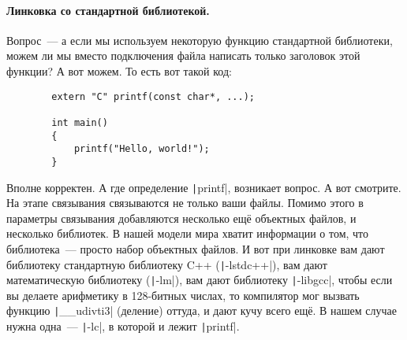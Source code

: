 \documentclass{article}
\begin{document}
    \paragraph{Линковка со стандартной библиотекой.}
    Вопрос~--- а если мы используем некоторую функцию стандартной библиотеки, можем ли мы вместо подключения файла написать только заголовок этой функции? А вот можем. То есть вот такой код:
    \begin{verbatim}
        extern "C" printf(const char*, ...);
        
        int main()
        {
            printf("Hello, world!");
        }
    \end{verbatim}
    Вполне корректен. А где определение \texttt|printf|, возникает вопрос. А вот смотрите. На этапе связывания связываются не только ваши файлы. Помимо этого в параметры связывания добавляются несколько ещё объектных файлов, и несколько библиотек. В нашей модели мира хватит информации о том, что библиотека~--- просто набор объектных файлов. И вот при линковке вам дают библиотеку стандартную библиотеку C++ (\texttt|-lstdc++|), вам дают математическую библиотеку (\texttt|-lm|), вам дают библиотеку \texttt|-libgcc|, чтобы если вы делаете арифметику в 128-битных числах, то компилятор мог вызвать функцию \texttt|__udivti3| (деление) оттуда, и дают кучу всего ещё. В нашем случае нужна одна~--- \texttt|-lc|, в которой и лежит \texttt|printf|.
\end{document}
